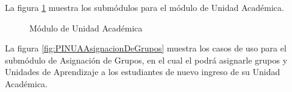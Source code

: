 
		La figura \ref{fig:PINUA} muestra los submódulos para el módulo de Unidad Académica.\\
		
		\begin{figure}[htbp]
			\begin{center}
				\caption{Módulo de Unidad Académica}
				\label{fig:PINUA}
			\end{center}
		\end{figure}
		
%
								
				La figura \ref{fig:PINUAAsignacionDeGrupos} muestra los casos de uso para el submódulo de Asignación de Grupos, en el cual el  podrá asignarle grupos y Unidades de Aprendizaje a los estudiantes de nuevo ingreso de su Unidad Académica.\\

